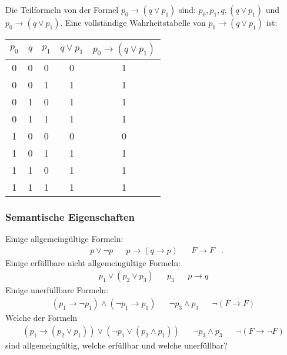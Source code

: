 \begin{example}
    Die Teilformeln von der Formel $p_0\to (q\lor p_1)$ sind: $p_0,p_1,q,(q\lor p_1)$ und $p_0\to (q\lor p_1)$. Eine vollständige Wahrheitstabelle von $p_0\to (q\lor p_1)$ ist:
    \begin{center}
        \begin{tabular} {| c | c | c || c | c |}
            \hline
            $p_0$ & $q$ & $p_1$ & $q\lor p_1$ & $p_0\to (q\lor p_1)$ \\ \hline
            0 & 0 & 0 & 0 & 1 \\
            0 & 0 & 1 & 1 & 1\\
            0 & 1 & 0 & 1 & 1\\
            0 & 1 & 1 & 1& 1\\
            1 & 0 & 0 & 0 & 0\\
            1 & 0 & 1 & 1 & 1\\
            1 & 1 & 0 & 1 & 1\\
            1 & 1 & 1 & 1 & 1\\ \hline
        \end{tabular}
    \end{center}
    \smallskip
\end{example}

\subsubsection{Semantische Eigenschaften}

\begin{example}
    Einige allgemeingültige Formeln:
    \begin{align*}
    &p\lor\neg p& &p\to (q\to p)& &F\to F&.
    \end{align*}
    Einige erfüllbare  nicht allgemeingültige Formeln:
    \begin{align*}
    &p_1\lor (p_2\lor p_3)& &p_3& &p\to q&
    \end{align*}
    Einige unerfüllbare Formeln:
    \begin{align*}
    &(p_1\to\neg p_1)\land(\neg p_1\to p_1)& &\neg p_3\land p_3& &\neg (F\to F)&
    \end{align*}
    Welche der Formeln
    \begin{align*}
    &(p_1\to (p_2\lor p_1))\lor(\neg p_1\lor (p_2\land p_1))& &\neg p_3\land p_3& &\neg (F\to \neg F)&
    \end{align*}
    sind allgemeingültig, welche erfüllbar und welche unerfüllbar?
\end{example}

